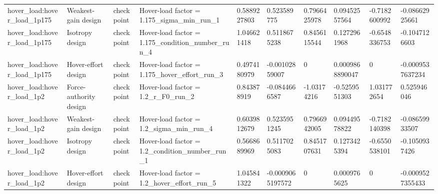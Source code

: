 \begin{tabular}{@{}llllllllll@{}}
hover\_load:hover\_load\_1p175 & Weakest-gain design & checkpoint & Hover-load factor = 1.175\_sigma\_min\_run\_1 & 0.5889227803 & 0.523589775 & 0.7966425978 & 0.09452557564 & -0.7182600992 & -0.08662925661 \\
hover\_load:hover\_load\_1p175 & Isotropy design & checkpoint & Hover-load factor = 1.175\_condition\_number\_run\_4 & 1.046621418 & 0.5118675238 & 0.8456115544 & 0.1272961968 & -0.6548336753 & -0.1047126603 \\
hover\_load:hover\_load\_1p175 & Hover-effort design & checkpoint & Hover-load factor = 1.175\_hover\_effort\_run\_3 & 0.4974180979 & -0.00102859007 & 0 & 0.0009868890047 & 0 & -0.0009537637234 \\
hover\_load:hover\_load\_1p2 & Force-authority design & checkpoint & Hover-load factor = 1.2\_r\_F0\_run\_2 & 0.843878919 & -0.0844666587 & -1.03174216 & -0.5259551303 & 1.031772654 & 0.525946046 \\
hover\_load:hover\_load\_1p2 & Weakest-gain design & checkpoint & Hover-load factor = 1.2\_sigma\_min\_run\_4 & 0.6039812679 & 0.5235951245 & 0.7966942005 & 0.09449578822 & -0.7182140398 & -0.08659933507 \\
hover\_load:hover\_load\_1p2 & Isotropy design & checkpoint & Hover-load factor = 1.2\_condition\_number\_run\_1 & 0.5668689969 & 0.5117025083 & 0.8451707631 & 0.1273425394 & -0.6550538101 & -0.1050937426 \\
hover\_load:hover\_load\_1p2 & Hover-effort design & checkpoint & Hover-load factor = 1.2\_hover\_effort\_run\_5 & 1.045841322 & -0.0009065197572 & 0 & 0.0009765625 & 0 & -0.0009527355433 \\
\bottomrule
\end{tabular}
